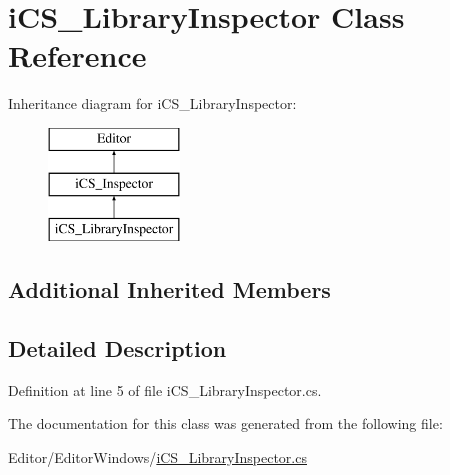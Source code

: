 \hypertarget{classi_c_s___library_inspector}{\section{i\+C\+S\+\_\+\+Library\+Inspector Class Reference}
\label{classi_c_s___library_inspector}
}
Inheritance diagram for i\+C\+S\+\_\+\+Library\+Inspector\+:\begin{figure}[H]
\begin{center}
\leavevmode
\includegraphics[height=3.000000cm]{classi_c_s___library_inspector}
\end{center}
\end{figure}
\subsection*{Additional Inherited Members}


\subsection{Detailed Description}


Definition at line 5 of file i\+C\+S\+\_\+\+Library\+Inspector.\+cs.



The documentation for this class was generated from the following file\+:\begin{DoxyCompactItemize}
\item 
Editor/\+Editor\+Windows/\hyperlink{i_c_s___library_inspector_8cs}{i\+C\+S\+\_\+\+Library\+Inspector.\+cs}\end{DoxyCompactItemize}
